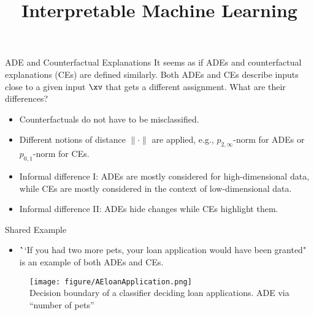 \documentclass[11pt,compress,t,notes=noshow, aspectratio=169, xcolor=table]{beamer}
\title{Interpretable Machine Learning}
\date{}
\begin{document}
\newcommand{\vertiii}[1]{{\left\vert\kern-0.25ex\left\vert\kern-0.25ex\left\vert #1 
    \right\vert\kern-0.25ex\right\vert\kern-0.25ex\right\vert}}


 \newcommand{\titlefigure}{figure/AEloanApplication.png} 
\newcommand{\learninggoals}{
\item Compare adversarial examples to counterfactual explanations
\item See an example where both coincident}



\begin{vbframe}{ADE and Counterfactual Explanations}
It seems as if ADEs and counterfactual explanations (CEs) are defined similarly. Both ADEs and CEs describe inputs close to a given input $\xv$ that gets a different assignment. What are their differences?
\begin{itemize}
    \item Counterfactuals do not have to be misclassified.
    \item Different notions of distance $\|\cdot\|$ are applied, e.g., $p_{2,\infty}$-norm for ADEs or $p_{0,1}$-norm for CEs.
    \item Informal difference I: ADEs are mostly considered for high-dimensional data, while CEs are mostly considered in the context of low-dimensional data.
    \item Informal difference II: ADEs hide changes while CEs highlight them.
\end{itemize}
\end{vbframe}

\begin{vbframe}{Shared Example }
\begin{itemize}
\item \textbf``If you had two more pets, your loan application would have been granted" is an example of both ADEs and CEs.
\end{itemize}
\begin{figure}[h]
\centering
\texttt{[image: figure/AEloanApplication.png]}\\
   \centering
  {Decision boundary of a classifier deciding loan applications. ADE via ``number of pets''}
  \label{fig:mnist}
\end{figure} 
\end{vbframe}

\endlecture
\end{document}
